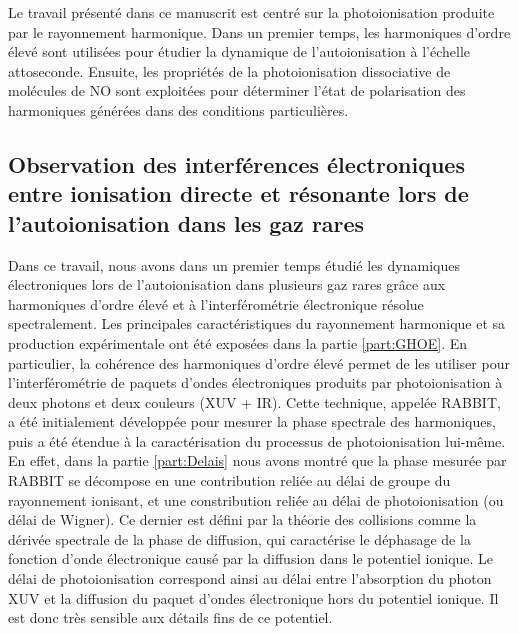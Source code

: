 \cleardoublepage
\renewcommand{\thesection}{\Roman{section}}
\setcounter{section}{0}
\renewcommand{\theHsection}{CL.\the\value{section}}
\renewcommand{\thefigure}{\Roman{section}.\arabic{figure}}
\renewcommand{\theHfigure}{CL.\Roman{section}.\arabic{figure}}
\setcounter{figure}{0}

\makeatletter
\def\toclevel@chapter{-1}
\def\toclevel@section{0}
\def\toclevel@subsection{1}
\makeatother

Le travail présenté dans ce manuscrit est centré sur la photoionisation produite par le rayonnement harmonique. Dans un premier temps, les harmoniques d'ordre élevé sont utilisées pour étudier la dynamique de l'autoionisation à l'échelle attoseconde. Ensuite, les propriétés de la photoionisation dissociative de molécules de NO sont exploitées pour déterminer l'état de polarisation des harmoniques générées dans des conditions particulières.

\subsection*{Observation des interférences électroniques entre ionisation directe et résonante lors de l'autoionisation dans les gaz rares}
Dans ce travail, nous avons dans un premier temps étudié les dynamiques électroniques lors de l'autoionisation dans plusieurs gaz rares grâce aux harmoniques d'ordre élevé et à l'interférométrie électronique résolue spectralement. Les principales caractéristiques du rayonnement harmonique et sa production expérimentale ont été exposées dans la partie \ref{part:GHOE}. En particulier, la cohérence des harmoniques d'ordre élevé permet de les utiliser pour l'interférométrie de paquets d'ondes électroniques produits par photoionisation à deux photons et deux couleurs (XUV + IR). Cette technique, appelée RABBIT, a été initialement développée pour mesurer la phase spectrale des harmoniques, puis a été étendue à la caractérisation du processus de photoionisation lui-même. En effet, dans la partie \ref{part:Delais} nous avons montré que la phase mesurée par RABBIT se décompose en une contribution reliée au délai de groupe du rayonnement ionisant, et une constribution reliée au délai de photoionisation (ou délai de Wigner). Ce dernier est défini par la théorie des collisions comme la dérivée spectrale de la phase de diffusion, qui caractérise le déphasage de la fonction d'onde électronique causé par la diffusion dans le potentiel ionique. Le délai de photoionisation correspond ainsi au délai entre l'absorption du photon XUV et la diffusion du paquet d'ondes électronique hors du potentiel ionique. Il est donc très sensible aux détails fins de ce potentiel.

